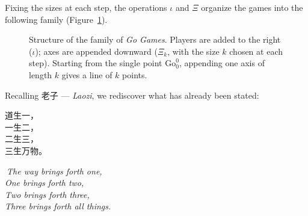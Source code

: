 Fixing the sizes at each step, the operations $\iota$ and $\Xi$ organize the games into the following family (Figure~\ref{fig:familia-go}).
\begin{figure}[H]
	\centering
	\caption{Structure of the family of \textit{Go Games}. Players are added to the right ($\iota$); axes are appended downward ($\Xi_k$, with the size $k$ chosen at each step). Starting from the single point $\mathrm{Go}^0_0$, appending one axis of length $k$ gives a line of $k$ points.}
	\label{fig:familia-go}
\end{figure}
Recalling 老子 — \textit{Laozi}, we rediscover what has already been stated:\\
\noindent
\begin{minipage}[t]{0.35\textwidth}
	\begin{flushright}
		{\large
			\vspace{1pt}
			道生一，\\
			一生二，\\
			二生三，\\
			三生万物。
		}
	\end{flushright}
\end{minipage}%
\hfill
\vrule
\hfill
\begin{minipage}[t]{0.48\textwidth}
	\raggedright
	\vspace{1pt}
	\emph{
		$\ \!\!\!$The way brings forth one, \\
		One brings forth two, \\
		Two brings forth three, \\
		Three brings forth all things.}
\end{minipage}

